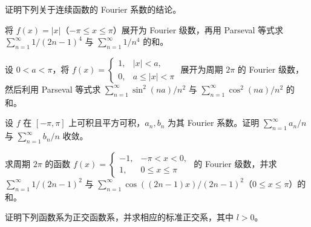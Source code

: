 \noindent\begin{minipage}{\textwidth}
证明下列关于连续函数的 Fourier 系数的结论。
\end{minipage}\par\vfill
\noindent\begin{minipage}{\textwidth}
将 $f(x)=|x|$（$-\pi\le x\le\pi$）展开为 Fourier 级数，再用 Parseval 等式求 $\sum_{n=1}^{\infty}1/(2n-1)^4$ 与 $\sum_{n=1}^{\infty}1/n^4$ 的和。
\end{minipage}\par\vfill
\noindent\begin{minipage}{\textwidth}
设 $0<a<\pi$，将 $f(x)=\begin{cases}1,&|x|<a,\\0,&a\le|x|<\pi\end{cases}$ 展开为周期 $2\pi$ 的 Fourier 级数，然后利用 Parseval 等式求 $\sum_{n=1}^{\infty}\sin^2(na)/n^2$ 与 $\sum_{n=1}^{\infty}\cos^2(na)/n^2$ 的和。
\end{minipage}\par\vfill
\newpage
\noindent\begin{minipage}{\textwidth}
设 $f$ 在 $[-\pi,\pi]$ 上可积且平方可积，$a_n,b_n$ 为其 Fourier 系数。证明 $\sum_{n=1}^{\infty}a_n/n$ 与 $\sum_{n=1}^{\infty}b_n/n$ 收敛。
\end{minipage}\par\vfill
\noindent\begin{minipage}{\textwidth}
求周期 $2\pi$ 的函数 $f(x)=\begin{cases}-1,&-\pi<x<0,\\1,&0\le x\le\pi\end{cases}$ 的 Fourier 级数，并求 $\sum_{n=1}^{\infty}1/(2n-1)^2$ 与 $\sum_{n=1}^{\infty}\cos((2n-1)x)/(2n-1)^2$（$0\le x\le\pi$）的和。
\end{minipage}\par\vfill
\noindent\begin{minipage}{\textwidth}
证明下列函数系为正交函数系，并求相应的标准正交系，其中 $l>0$。
\end{minipage}\par\vfill
